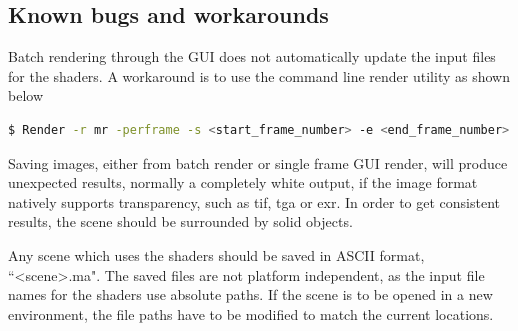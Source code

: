 \subsection{Known bugs and workarounds}
\label{sec:known_bugs_and_workarounds}

Batch rendering through the \Maya GUI does not automatically update the input files for the shaders.
A workaround is to use the command line render utility as shown below

\begin{lstlisting}[language=bash,caption={Batch render command}]
$ Render -r mr -perframe -s <start_frame_number> -e <end_frame_number> <path_to_scene_file>
\end{lstlisting}

Saving images, either from batch render or single frame GUI render, will produce unexpected results, normally a completely white output, if the image format natively supports transparency, such as tif, tga or exr.
In order to get consistent results, the scene should be surrounded by solid objects.

Any \Maya scene which uses the shaders should be saved in \Maya ASCII format, ``{\textless}scene{\textgreater}.ma".
The saved files are not platform independent, as the input file names for the shaders use absolute paths.
If the scene is to be opened in a new environment, the file paths have to be modified to match the current locations.